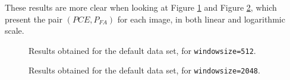 \documentclass[a4paper, 11pt]{article}
\begin{document}
These results are more clear when looking at Figure \ref{fig:defaultdataset512} and Figure \ref{fig:defaultdataset2048}, which present the pair $(PCE,P_{FA})$ for each image, in both linear and logarithmic scale.

\begin{figure}[H]
	\centering
	\caption{Results obtained for the default data set, for \texttt{windowsize=512}.}
	\label{fig:defaultdataset512}
\end{figure}
\begin{figure}[H]
	\centering
	\caption{Results obtained for the default data set, for \texttt{windowsize=2048}.}
	\label{fig:defaultdataset2048}
\end{figure}
\end{document}
